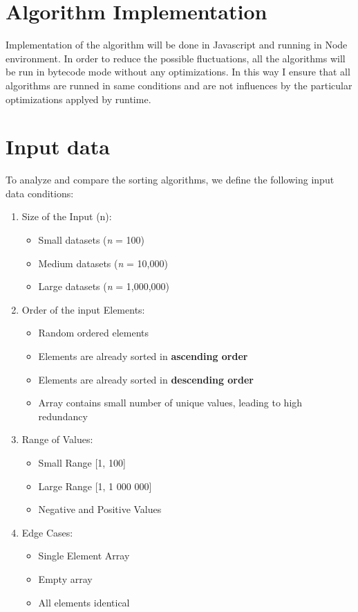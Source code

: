 \documentclass[12pt]{article}
\begin{document}
\clearpage
\section*{Algorithm Implementation}
\hspace{0.8cm}

Implementation of the algorithm will be done in Javascript and running in Node environment.
In order to reduce the possible fluctuations, all the algorithms will be run in bytecode 
mode without any optimizations. In this way I ensure that all algorithms are 
runned in same conditions and are not influences by the particular optimizations applyed by
runtime.\cite{bytecoderef}

\clearpage
\section*{Input data}
\hspace{0.8cm}
To analyze and compare the sorting algorithms, we define the following input data conditions:
\begin{enumerate}
    \item Size of the Input (n):
      \begin{itemize}
        \item Small datasets (\textit{n} = 100)  
        \item Medium datasets (\textit{n} = 10,000)  
        \item Large datasets (\textit{n} = 1,000,000)  
      \end{itemize}

    \item Order of the input Elements:
      \begin{itemize}
        \item Random ordered elements
        \item Elements are already sorted in \textbf{ascending order}
        \item Elements are already sorted in \textbf{descending order}
        \item Array contains small number of unique values, leading to high redundancy
      \end{itemize}

    \item Range of Values:
      \begin{itemize}
        \item Small Range [1, 100]
        \item Large Range [1, 1 000 000]
        \item Negative and Positive Values
      \end{itemize}

    \item Edge Cases:
      \begin{itemize}
        \item Single Element Array
        \item Empty array
        \item All elements identical
      \end{itemize}
\end{enumerate}
\end{document}
